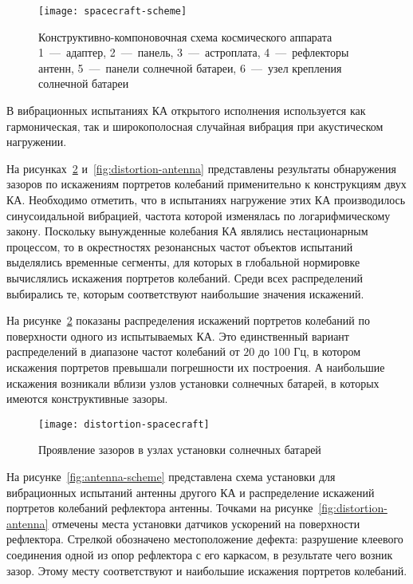 \begin{figure}[!htb]
	\centerfloat
	\texttt{[image: spacecraft-scheme]}
	\caption{Конструктивно-компоновочная схема космического аппарата \\ 1~---~адаптер, 2~---~панель, 3~---~астроплата, 4~---~рефлекторы антенн, 5~---~панели солнечной батареи, 6~---~узел крепления солнечной батареи} \label{fig:spacecraft-scheme}
\end{figure}

В вибрационных испытаниях КА открытого исполнения используется как гармоническая, так и широкополосная случайная вибрация при акустическом нагружении.

На рисунках~\ref{fig:distortion-spacecraft} и~\ref{fig:distortion-antenna} представлены результаты обнаружения зазоров по искажениям портретов колебаний применительно к конструкциям двух КА. Необходимо отметить, что в испытаниях нагружение этих КА производилось синусоидальной вибрацией, частота которой изменялась по логарифмическому закону. Поскольку вынужденные колебания КА являлись нестационарным процессом, то в окрестностях резонансных частот объектов испытаний выделялись временные сегменты, для которых в глобальной нормировке вычислялись искажения портретов колебаний. Среди всех распределений выбирались те, которым соответствуют наибольшие значения искажений. 

На рисунке~\ref{fig:distortion-spacecraft} показаны распределения искажений портретов колебаний по поверхности одного из испытываемых КА. Это единственный вариант распределений в диапазоне частот колебаний от $ 20 $ до $ 100 $ Гц, в котором искажения портретов превышали погрешности их построения. А наибольшие искажения возникали вблизи узлов установки солнечных батарей, в которых имеются конструктивные зазоры. 

\begin{figure}[!htb]
	\centerfloat
	\texttt{[image: distortion-spacecraft]}
	\caption{Проявление зазоров в узлах установки солнечных батарей} \label{fig:distortion-spacecraft}
\end{figure}

На рисунке~\ref{fig:antenna-scheme} представлена схема установки для вибрационных испытаний антенны другого КА и распределение искажений портретов колебаний рефлектора антенны. Точками на рисунке~\ref{fig:distortion-antenna} отмечены места установки датчиков ускорений на поверхности рефлектора. Стрелкой обозначено местоположение дефекта: разрушение клеевого соединения одной из опор рефлектора с его каркасом, в результате чего возник зазор. Этому месту соответствуют и наибольшие искажения портретов колебаний.

